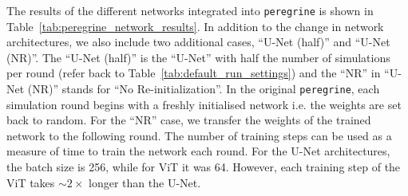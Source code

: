 The results of the different networks integrated into \texttt{peregrine} is shown in Table~\ref{tab:peregrine_network_results}. In addition to the change in network architectures, we also include two additional cases, \enquote{U-Net (half)} and \enquote{U-Net (NR)}. The \enquote{U-Net (half)} is the \enquote{U-Net} with half the number of simulations per round (refer back to Table~\ref{tab:default_run_settings}) and the \enquote{NR} in \enquote{U-Net (NR)} stands for \enquote{No Re-initialization}. In the original \texttt{peregrine}, each simulation round begins with a freshly initialised network i.e. the weights are set back to random. For the \enquote{NR} case, we transfer the weights of the trained network to the following round. The number of training steps can be used as a measure of time to train the network each round. For the U-Net architectures, the batch size is 256, while for ViT it was 64. However, each training step of the ViT takes $\sim2\times$ longer than the U-Net.

